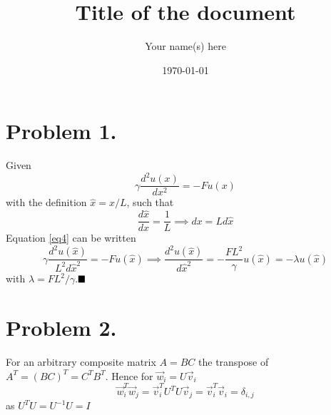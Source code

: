 \documentclass[english,notitlepage]{revtex4-1}  %
\begin{document}
\title{Title of the document}      %
\author{Your name(s) here}          %
\date{\today}                             %
\noaffiliation                            %


\maketitle 
    

\section*{Problem 1.}
    Given
    \begin{equation}
            \gamma \frac{d^2 u(x)}{d x^2}
        =   -Fu(x)
        \label{eq4}
    \end{equation}
    with the definition $\hat{x} = x/L$, such that
    \begin{equation*}
            \frac{d\hat{x}}{d x}
        =   \frac{1}{L}
        \implies 
            dx
        =   L d\hat{x}
    \end{equation*}
    Equation \ref{eq4} can be written
    \begin{equation*}
            \gamma \frac{d^2 u(\hat{x})}{L^2 d\hat{x}^2}
        =   -Fu(\hat{x})
        \implies
            \frac{d^2 u(\hat{x})}{d \hat{x}^2}
        =   -\frac{FL^2}{\gamma}u(\hat{x})
        =   -\lambda u(\hat{x})
    \end{equation*}
    with $\lambda = FL^2/\gamma$.$\hfill\blacksquare$


\section*{Problem 2.}
    For an arbitrary composite matrix $A = BC$ the transpose of $A^T = (BC)^T = C^TB^T$.
    Hence for $\vec{w}_i = U\vec{v}_i$
    \begin{equation*}
            \vec{w}^T_i\vec{w}_j
        =   \vec{v}^T_iU^TU\vec{v}_j
        =   \vec{v}^T_i\vec{v}_i
        =   \delta_{i,j}
    \end{equation*}
    as $U^TU = U^{-1}U = I$
\end{document}
